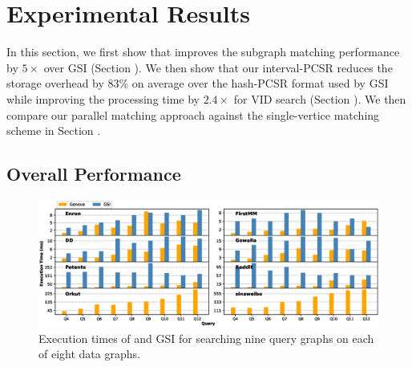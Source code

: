 \section{Experimental Results}
In this section, we first show that \SystemName improves the subgraph matching performance by $5\times$ over GSI (Section ). We
then show that our interval-PCSR reduces the storage overhead by 83\% on average over the hash-PCSR format used by GSI while improving the
processing time by $2.4\times$ for VID search (Section ). We then compare our parallel matching approach against the
single-vertice matching scheme in Section . 


\subsection{Overall Performance\label{sec:comparegsi}}
\begin{figure}
\centering
\includegraphics[width=\textwidth]{./figure/overperformance.eps}
\caption{Execution times of \SystemName and GSI for searching nine query graphs on each of eight data graphs.}	
\label{fig:overallperf}
\end{figure}

